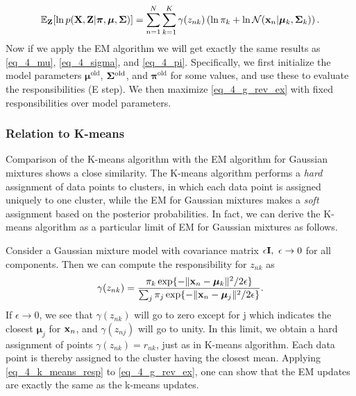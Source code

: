 \documentclass[../book-template.tex]{subfiles}
\begin{document}
\begin{equation}\label{eq_4_g_rev_ex}
	\mathbb{E}_{\bf Z}[\ln p({\bf X,Z}|\bm{\pi},\bm{\mu},{\bf \Sigma})] =  \sum_{n=1}^{N}\sum_{k=1}^{K} \gamma(z_{nk})\left(\ln \pi_k +\ln \mathcal{N}({\bf x}_n|\bm{\mu}_k,{\bf \Sigma}_k)\right).
\end{equation}
Now if we apply the EM algorithm we will get exactly the same results as \eqref{eq_4_mu}, \eqref{eq_4_sigma}, and \eqref{eq_4_pi}. Specifically, we first initialize the model parameters $\bm{\mu}^{\text{old}}$, ${\bf \Sigma}^{\text{old}}$, and $\bm{\pi}^{\text{old}}$ for some values, and use these to evaluate the responsibilities (E step). We then maximize \eqref{eq_4_g_rev_ex} with fixed responsibilities over model parameters.

\subsubsection{Relation to K-means}
Comparison of the K-means algorithm with the EM algorithm for Gaussian mixtures shows a close similarity. The K-means algorithm performs a \emph{hard} assignment of data points to clusters, in which each data point is assigned uniquely to one cluster, while the EM for Gaussian mixtures makes a \emph{soft} assignment based on the posterior probabilities. In fact, we can derive the K-means algorithm as a particular limit of EM for Gaussian mixtures as follows.
\par Consider a Gaussian mixture model with covariance matrix $\epsilon {\bf I},\ \epsilon\rightarrow 0$ for all components. Then we can compute the responsibility for $z_{nk}$ as
\begin{equation}\label{eq_4_k_means_resp}
	\gamma(z_{nk}) = \frac{\pi_k \exp\{-\|{\bf x}_n - \bm{\mu}_k\|^2/2\epsilon\}}
	{\sum_j \pi_j \exp\{-\|{\bf x}_n - \bm{\mu}_j\|^2/2\epsilon\}}.
\end{equation}
If $\epsilon\rightarrow 0$, we see that $\gamma(z_{nk})$ will go to zero except for j which indicates the closest $\bm{\mu}_j$ for ${\bf x}_n$, and $\gamma(z_{nj})$ will go to unity. In this limit, we obtain a hard assignment of points $\gamma(z_{nk})=r_{nk}$, just as in K-means algorithm. Each data point is thereby assigned to the cluster having the closest mean. Applying \eqref{eq_4_k_means_resp} to \eqref{eq_4_g_rev_ex}, one can show that the EM updates are exactly the same as the k-means updates.
\end{document}
